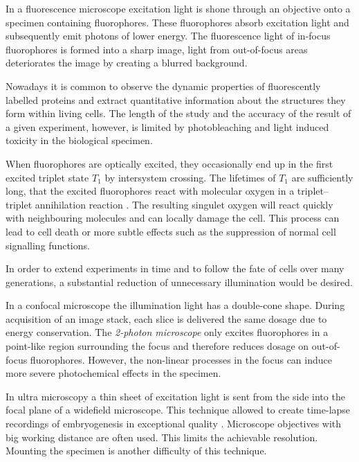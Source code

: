 \documentclass[a4paper, 11pt]{article}
\begin{document}
\begin{multicols}{2}


In a fluorescence microscope excitation light is shone through an
objective onto a specimen containing fluorophores. These fluorophores
absorb excitation light and subsequently emit photons of lower
energy. The fluorescence light of in-focus fluorophores is formed into
a sharp image, light from out-of-focus areas deteriorates the image by
creating a blurred background.

Nowadays it is common to observe the dynamic properties of
fluorescently labelled proteins and extract quantitative information
about the structures they form within living cells. The length of the
study and the accuracy of the result of a given experiment, however,
is limited by photobleaching and light induced toxicity in the
biological specimen.

When fluorophores are optically excited, they occasionally end up in
the first excited triplet state $T_1$ by intersystem crossing. The
lifetimes of $T_1$ are sufficiently long, that the excited
fluorophores react with molecular oxygen in a triplet--triplet
annihilation reaction \cite{Linde2011a}. The resulting singulet oxygen
will react quickly with neighbouring molecules and can locally damage
the cell. This process can lead to cell death or more subtle effects
such as the suppression of normal cell signalling functions.

In order to extend experiments in time and to follow the fate of cells
over many generations, a substantial reduction of unnecessary
illumination would be desired.

In a confocal microscope the illumination light has a double-cone
shape. During acquisition of an image stack, each slice is delivered
the same dosage due to energy conservation. The \emph{2-photon
  microscope} only excites fluorophores in a point-like region
surrounding the focus \cite{Denk1990} and therefore reduces
dosage on out-of-focus fluorophores. However, the non-linear processes
in the focus can induce more severe photochemical effects in the
specimen.

In ultra microscopy \cite{Siedentopf1903,Voie1993} a thin sheet of
excitation light is sent from the side into the focal plane of a
widefield microscope. This technique allowed to create time-lapse
recordings of embryogenesis in exceptional quality \cite{Huisken2004}.
Microscope objectives with big working distance are often used. This
limits the achievable resolution. Mounting the specimen is another
difficulty of this technique.


\end{multicols}
\end{document}

